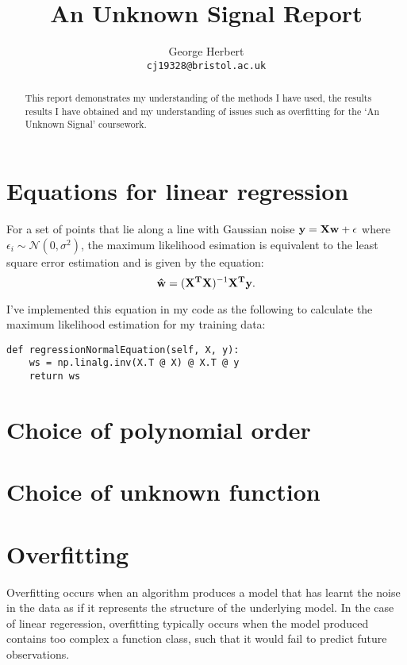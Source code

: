 \documentclass[onecolumn, 12pt, a4paper]{article}
\author{
  George Herbert\\
  \texttt{cj19328@bristol.ac.uk}
}
\title{An Unknown Signal Report}
\begin{document}
\maketitle

\begin{abstract}
    This report demonstrates my understanding of the methods I have 
    used, the results results I have obtained and my understanding
    of issues such as overfitting for the `An Unknown Signal'
    coursework.
\end{abstract}

\section{Equations for linear regression}

For a set of points that lie along a line with Gaussian noise 
$\vb{y} = \vb{X}\vb{w} + \vb{\epsilon}$ where $\epsilon_{i} \sim \mathcal{N}(0, \sigma^{2})$,
the maximum likelihood esimation is equivalent to the least square 
error estimation and is given by the equation:
\[
    \vb{\hat{w}} = (\vb{X^{T}}\vb{X})^{-1}\vb{X^{T}}\vb{y}.
\]

I've implemented this equation in my code as the following to calculate
the maximum likelihood estimation for my training data:
\begin{verbatim}
def regressionNormalEquation(self, X, y):
    ws = np.linalg.inv(X.T @ X) @ X.T @ y
    return ws
\end{verbatim}

\section{Choice of polynomial order}

\section{Choice of unknown function}

\section{Overfitting}

Overfitting occurs when an algorithm produces a model that has
learnt the noise in the data as if it represents the
structure of the underlying model.
In the case of linear regeression, overfitting typically occurs
when the model produced contains too complex a function class,
such that it would fail to predict future observations.
\end{document}
